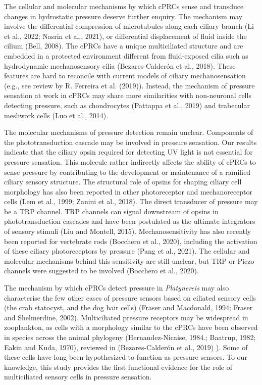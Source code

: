 \documentclass[
  11pt,
]{article}
\begin{document}
The cellular and molecular mechanisms by which cPRCs sense and transduce
changes in hydrostatic pressure deserve further enquiry. The mechanism
may involve the differential compression of microtubules along each
ciliary branch (Li et al., 2022; Nasrin et al., 2021), or differential
displacement of fluid inside the cilium (Bell, 2008). The cPRCs have a
unique multiciliated structure and are embedded in a protected
environment different from fluid-exposed cilia such as hydrodynamic
mechanosensory cilia (Bezares-Calderón et al., 2018). These features are
hard to reconcile with current models of ciliary mechanosensation (e.g.,
see review by R. Ferreira et al. (2019)). Instead, the mechanism of
pressure sensation at work in cPRCs may share more similarities with
non-neuronal cells detecting pressure, such as chondrocytes (Pattappa et
al., 2019) and trabecular meshwork cells (Luo et al., 2014).

The molecular mechanisms of pressure detection remain unclear.
Components of the phototransduction cascade may be involved in pressure
sensation. Our results indicate that the ciliary opsin required for
detecting UV light is not essential for pressure sensation. This
molecule rather indirectly affects the ability of cPRCs to sense
pressure by contributing to the development or maintenance of a ramified
ciliary sensory structure. The structural role of opsins for shaping
ciliary cell morphology has also been reported in other photoreceptor
and mechanoreceptor cells (Lem et al., 1999; Zanini et al., 2018). The
direct transducer of pressure may be a TRP channel. TRP channels can
signal downstream of opsins in phototransduction cascades and have been
postulated as the ultimate integrators of sensory stimuli (Liu and
Montell, 2015). Mechanosensitivity has also recently been reported for
vertebrate rods (Bocchero et al., 2020), including the activation of
these ciliary photoreceptors by pressure (Pang et al., 2021). The
cellular and molecular mechanisms behind this sensitivity are still
unclear, but TRP or Piezo channels were suggested to be involved
(Bocchero et al., 2020).

The mechanism by which cPRCs detect pressure in \emph{Platynereis} may
also characterise the few other cases of pressure sensors based on
ciliated sensory cells (the crab statocyst, and the dog hair cells)
(Fraser and Macdonald, 1994; Fraser and Shelmerdine, 2002).
Multiciliated pressure receptors may be widespread in zooplankton, as
cells with a morphology similar to the cPRCs have been observed in
species across the animal phylogeny (Hernandez-Nicaise, 1984.; Baatrup,
1982; Eakin and Kuda, 1970), reviewed in (Bezares-Calderón et al., 2019)
). Some of these cells have long been hypothesized to function as
pressure sensors. To our knowledge, this study provides the first
functional evidence for the role of multiciliated sensory cells in
pressure sensation.
\end{document}
